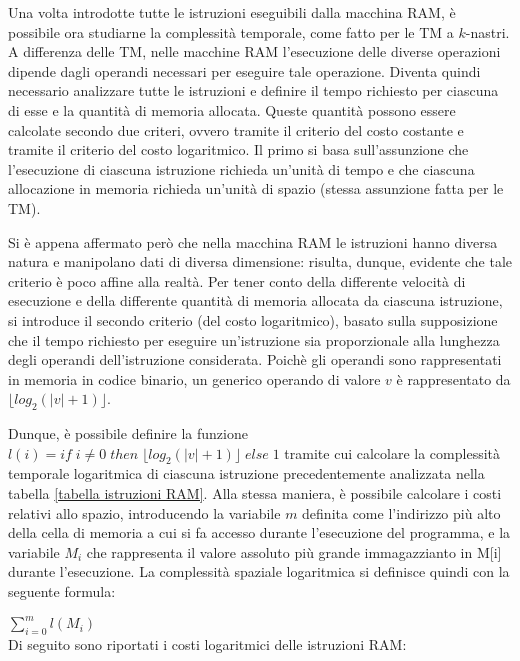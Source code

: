   Una volta introdotte tutte le istruzioni eseguibili dalla macchina RAM, è possibile ora studiarne la complessità temporale, come fatto per le TM a \(k\)-nastri. A differenza delle TM, nelle macchine RAM l'esecuzione delle diverse operazioni dipende dagli operandi necessari per eseguire tale operazione. Diventa quindi necessario analizzare tutte le istruzioni e definire il tempo richiesto per ciascuna di esse e la quantità di memoria allocata. Queste quantità possono essere calcolate secondo due criteri, ovvero tramite il criterio del costo costante e tramite il criterio del costo logaritmico. Il primo si basa sull'assunzione che l'esecuzione di ciascuna istruzione richieda un'unità di tempo e che ciascuna allocazione in memoria richieda un'unità di spazio (stessa assunzione fatta per le TM). 
  
  Si è appena affermato però che nella macchina RAM le istruzioni hanno diversa natura e manipolano dati di diversa dimensione: risulta, dunque, evidente che tale criterio è poco affine alla realtà. Per tener conto della differente velocità di esecuzione e della differente quantità di memoria allocata da ciascuna istruzione, si introduce il secondo criterio (del costo logaritmico), basato sulla supposizione che il tempo richiesto per eseguire un'istruzione sia proporzionale alla lunghezza degli operandi dell'istruzione considerata. Poichè gli operandi sono rappresentati in memoria in codice binario, un generico operando di valore \(v\) è rappresentato da \(\lfloor log_2(|v|+1)\rfloor\). 
  
  Dunque, è possibile definire la funzione \(l(i) = if\;i\neq 0\;then\;\lfloor log_2(|v|+1)\rfloor\;else\;1\) tramite cui calcolare la complessità temporale logaritmica di ciascuna istruzione precedentemente analizzata nella tabella \ref{tabella istruzioni RAM}. Alla stessa maniera, è possibile calcolare i costi relativi allo spazio, introducendo la variabile \(m\) definita come l'indirizzo più alto della cella di memoria a cui si fa accesso durante l'esecuzione del programma, e la variabile \(M_i\) che rappresenta il valore assoluto più grande immagazzianto in M[i] durante l'esecuzione. La complessità spaziale logaritmica si definisce quindi con la seguente formula:

  \(\displaystyle \sum_{i=0}^m{l(M_i)}\)\\
  Di seguito sono riportati i costi logaritmici delle istruzioni RAM:

